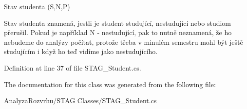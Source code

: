 Stav studenta (S,N,P) 

Stav studenta znamená, jestli je student studující, nestudující nebo studiom přerušil. Pokud je například N -\/ nestudující, pak to nutně neznamená, že ho nebudeme do analýzy počítat, protože třeba v minulém semestru mohl být ještě studujícím i když ho teď vidíme jako nestudujícího.

Definition at line 37 of file S\+T\+A\+G\+\_\+\+Student.\+cs.



The documentation for this class was generated from the following file\+:\begin{DoxyCompactItemize}
\item 
Analyza\+Rozvrhu/\+S\+T\+A\+G Classes/S\+T\+A\+G\+\_\+\+Student.\+cs\end{DoxyCompactItemize}
